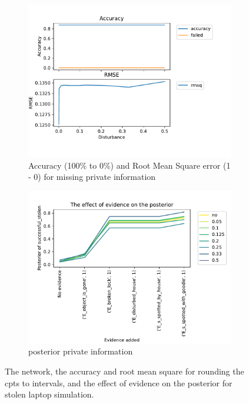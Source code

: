 \begin{figure}[htbp]
\begin{subfigure}{.45\textwidth}
\includegraphics[width=\linewidth]{../experiments/StolenLaptopPrivate/plots/performance_StolenLaptopPrivate.pdf}
\caption{Accuracy (100\% to 0\%) and Root Mean Square error (1 - 0) for missing private information}
\label{privatelaptopA}
\end{subfigure}%
\begin{subfigure}{.45\textwidth}
\includegraphics[width=\linewidth]{../experiments/StolenLaptopPrivate/plots/posterior_StolenLaptopPrivate.pdf}
\caption{posterior private information}
\label{privatelaptoppost}
\end{subfigure}

\caption{The network, the accuracy and root mean square for rounding the cpts to intervals, and the effect of evidence on the posterior for stolen laptop simulation.}
\label{private}

\end{figure}


